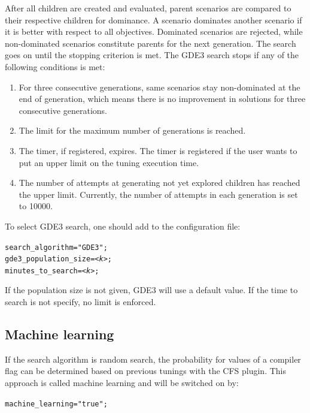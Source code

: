 \documentclass[11pt,a4paper, oneside]{book} %
\begin{document}
After all children are created and evaluated, parent scenarios are compared
to their respective children for dominance. A scenario dominates another
scenario if it is better with respect to all objectives. Dominated scenarios
are rejected, while non-dominated scenarios constitute parents for the next
generation. The search goes on until the stopping criterion is met. The GDE3
search stops if any of the following conditions is met:

\begin{enumerate}
\item For three consecutive generations, same scenarios stay non-dominated at the end of generation, which means there is no improvement in solutions for three consecutive generations.
\item The limit for the maximum number of generations is reached.
\item The timer, if registered, expires. The timer is registered if the
    user wants to put an upper limit on the tuning execution time.
\item The number of attempts at generating not yet explored children has
    reached the upper limit. Currently, the number of attempts in each
    generation is set to 10000.
\end{enumerate}


To select GDE3 search, one should add to the configuration file:

\begin{center}
\begin{minipage}{0.8\textwidth}
	\texttt{search\_algorithm="GDE3";\\
	gde3\_population\_size=\textit{<k>};\\
    minutes\_to\_search=\textit{<k>};}
\end{minipage}
\end{center}

If the population size is not given, GDE3 will use a default value. If the time to search is not specify, no limit is enforced.

\subsection{Machine learning}

If the search algorithm is random search, the probability for values of a  compiler flag can be determined based on previous tunings with the CFS plugin. This approach is called machine learning and will be switched on by:
\begin{center}
\begin{minipage}{0.8\textwidth}
	\texttt{machine\_learning="true";}
\end{minipage}
\end{center}
\end{document}
